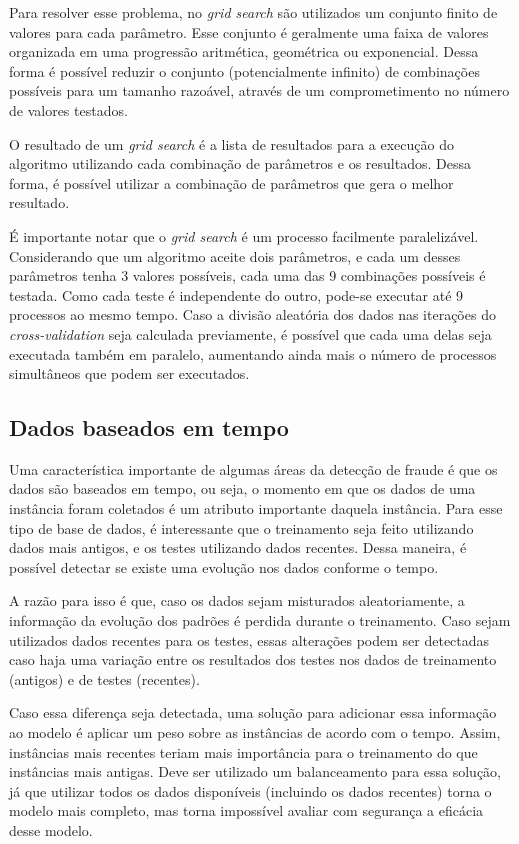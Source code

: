 Para resolver esse problema, no \emph{grid search} são utilizados um conjunto finito de valores para cada parâmetro. Esse conjunto é geralmente uma faixa de valores organizada em uma progressão aritmética, geométrica ou exponencial. Dessa forma é possível reduzir o conjunto (potencialmente infinito) de combinações possíveis para um tamanho razoável, através de um comprometimento no número de valores testados.

O resultado de um \emph{grid search} é a lista de resultados para a execução do algoritmo utilizando cada combinação de parâmetros e os resultados. Dessa forma, é possível utilizar a combinação de parâmetros que gera o melhor resultado.

É importante notar que o \emph{grid search} é um processo facilmente paralelizável. Considerando que um algoritmo aceite dois parâmetros, e cada um desses parâmetros tenha 3 valores possíveis, cada uma das 9 combinações possíveis é testada. Como cada teste é independente do outro, pode-se executar até 9 processos ao mesmo tempo. Caso a divisão aleatória dos dados nas iterações do \emph{cross-validation} seja calculada previamente, é possível que cada uma delas seja executada também em paralelo, aumentando ainda mais o número de processos simultâneos que podem ser executados.

\subsection{Dados baseados em tempo}

Uma característica importante de algumas áreas da detecção de fraude é que os dados são baseados em tempo, ou seja, o momento em que os dados de uma instância foram coletados é um atributo importante daquela instância. Para esse tipo de base de dados, é interessante que o treinamento seja feito utilizando dados mais antigos, e os testes utilizando dados recentes. Dessa maneira, é possível detectar se existe uma evolução nos dados conforme o tempo.

A razão para isso é que, caso os dados sejam misturados aleatoriamente, a informação da evolução dos padrões é perdida durante o treinamento. Caso sejam utilizados dados recentes para os testes, essas alterações podem ser detectadas caso haja uma variação entre os resultados dos testes nos dados de treinamento (antigos) e de testes (recentes).

Caso essa diferença seja detectada, uma solução para adicionar essa informação ao modelo é aplicar um peso sobre as instâncias de acordo com o tempo. Assim, instâncias mais recentes teriam mais importância para o treinamento do que instâncias mais antigas. Deve ser utilizado um balanceamento para essa solução, já que utilizar todos os dados disponíveis (incluindo os dados recentes) torna o modelo mais completo, mas torna impossível avaliar com segurança a eficácia desse modelo.

